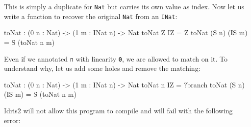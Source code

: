 \documentclass[
]{article}
\newenvironment{Shaded}{}{}
\newcommand{\DataTypeTok}[1]{\textcolor[rgb]{0.56,0.13,0.00}{#1}}
\newcommand{\DecValTok}[1]{\textcolor[rgb]{0.25,0.63,0.44}{#1}}
\newcommand{\NormalTok}[1]{#1}
\newcommand{\OperatorTok}[1]{\textcolor[rgb]{0.40,0.40,0.40}{#1}}
\newcommand{\OtherTok}[1]{\textcolor[rgb]{0.00,0.44,0.13}{#1}}
\begin{document}
This is simply a duplicate for \texttt{Nat} but carries its own value as
index. Now let us write a function to recover the original \texttt{Nat}
from an \texttt{INat}:

\begin{Shaded}
\begin{Highlighting}[]
\NormalTok{toNat }\OperatorTok{:}\NormalTok{ (}\DecValTok{0}\NormalTok{ n }\OperatorTok{:} \DataTypeTok{Nat}\NormalTok{) }\OtherTok{{-}\textgreater{}}\NormalTok{ (}\DecValTok{1}\NormalTok{ m }\OperatorTok{:} \DataTypeTok{INat}\NormalTok{ n) }\OtherTok{{-}\textgreater{}} \DataTypeTok{Nat}
\NormalTok{toNat }\DataTypeTok{Z} \DataTypeTok{IZ} \OtherTok{=} \DataTypeTok{Z}
\NormalTok{toNat (}\DataTypeTok{S}\NormalTok{ n) (}\DataTypeTok{IS}\NormalTok{ m) }\OtherTok{=} \DataTypeTok{S}\NormalTok{ (toNat n m)}
\end{Highlighting}
\end{Shaded}

Even if we annotated \texttt{n} with linearity \texttt{0}, we are
allowed to match on it. To understand why, let us add some holes and
remove the matching:

\begin{Shaded}
\begin{Highlighting}[]
\NormalTok{toNat }\OperatorTok{:}\NormalTok{ (}\DecValTok{0}\NormalTok{ n }\OperatorTok{:} \DataTypeTok{Nat}\NormalTok{) }\OtherTok{{-}\textgreater{}}\NormalTok{ (}\DecValTok{1}\NormalTok{ m }\OperatorTok{:} \DataTypeTok{INat}\NormalTok{ n) }\OtherTok{{-}\textgreater{}} \DataTypeTok{Nat}
\NormalTok{toNat n }\DataTypeTok{IZ} \OtherTok{=} \OperatorTok{?}\NormalTok{branch}
\NormalTok{toNat (}\DataTypeTok{S}\NormalTok{ n) (}\DataTypeTok{IS}\NormalTok{ m) }\OtherTok{=} \DataTypeTok{S}\NormalTok{ (toNat n m)}
\end{Highlighting}
\end{Shaded}

Idris2 will not allow this program to compile and will fail with the
following error:
\end{document}
